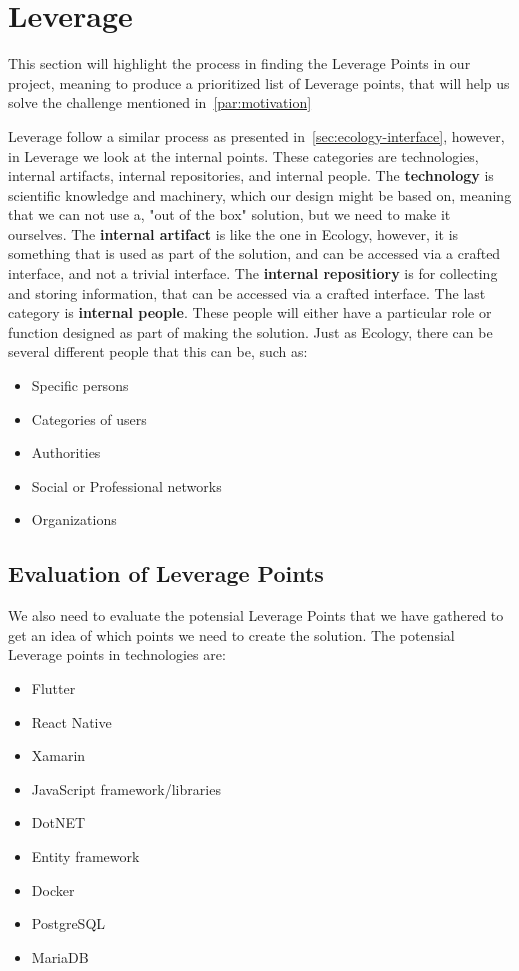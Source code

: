 \section{Leverage}\label{sec:leverage}
This section will highlight the process in finding the Leverage Points in our project, meaning to produce a prioritized list of Leverage points, that will help us solve the challenge mentioned in~\autoref{par:motivation}

Leverage follow a similar process as presented in~\autoref{sec:ecology-interface}, however, in Leverage we look at the internal points.
These categories are technologies, internal artifacts, internal repositories, and internal people.
The \textbf{technology} is scientific knowledge and machinery, which our design might be based on, meaning that we can not use a, "out of the box" solution, but we need to make it ourselves.
The \textbf{internal artifact} is like the one in Ecology, however, it is something that is used as part of the solution, and can be accessed via a crafted interface, and not a trivial interface.
The \textbf{internal repositiory} is for collecting and storing information, that can be accessed via a crafted interface.
The last category is \textbf{internal people}.
These people will either have a particular role or function designed as part of making the solution.
Just as Ecology, there can be several different people that this can be, such as:

\begin{itemize}
    \item Specific persons
    \item Categories of users
    \item Authorities
    \item Social or Professional networks
    \item Organizations
\end{itemize}

\subsection{Evaluation of Leverage Points}
We also need to evaluate the potensial Leverage Points that we have gathered to get an idea of which points we need to create the solution.
The potensial Leverage points in technologies are:

\begin{itemize}
    \item Flutter
    \item React Native
    \item Xamarin
    \item JavaScript framework/libraries
    \item DotNET
    \item Entity framework
    \item Docker
    \item PostgreSQL
    \item MariaDB
\end{itemize}

